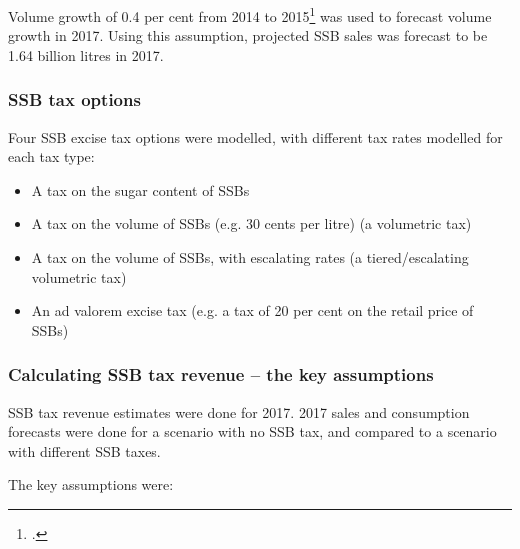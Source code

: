 \documentclass[embargoed]{grattan}
\begin{document}
Volume growth of 0.4 per cent from 2014 to 2015\footcite{Media2015RetailWorldAnnual} was used to forecast volume growth in 2017.
Using this assumption, projected SSB sales was forecast to be 1.64 billion litres in 2017.

\subsubsection{SSB tax options}\label{ssb-tax-options}

Four SSB excise tax options were modelled, with different tax rates modelled for each tax type:

\begin{itemize}
\item
  A tax on the sugar content of SSBs
\item
  A tax on the volume of SSBs (e.g. 30 cents per litre) (a volumetric tax)
\item
  A tax on the volume of SSBs, with escalating rates (a tiered/escalating volumetric tax)
\item
  An ad valorem excise tax (e.g. a tax of 20 per cent on the retail price of SSBs)
\end{itemize}

\subsubsection{Calculating SSB tax revenue -- the key assumptions }\label{calculating-ssb-tax-revenue-the-key-assumptions}

SSB tax revenue estimates were done for 2017. 2017 sales and consumption forecasts were done for a scenario with no SSB tax, and compared to a scenario with different SSB taxes.

The key assumptions were:
\end{document}
